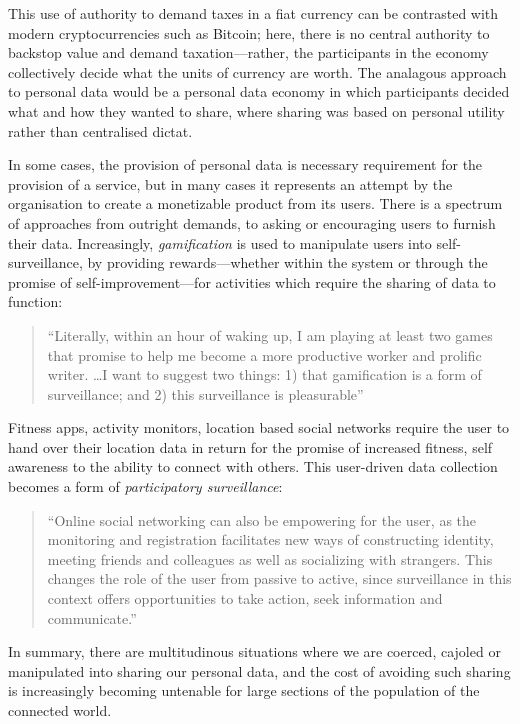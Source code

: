 \documentclass{IOS-Book-Article}     %
\begin{document}
This use of authority to demand taxes in a fiat currency can be contrasted with modern
cryptocurrencies such as Bitcoin; here, there is no central authority to 
backstop value and demand taxation---rather, the participants in the economy collectively decide what the units
of currency are worth. 
The analagous approach to personal data would be a personal data economy in
which participants decided what and how they wanted to share, where sharing was
based on personal utility rather than centralised dictat.

In some cases, the provision of personal data is
necessary requirement for the provision of a service, but in many
cases it represents an attempt by the organisation to create a monetizable product from
its users. There is a spectrum of approaches from outright demands, 
to asking or encouraging users to furnish their data.
Increasingly, \emph{gamification} is used to manipulate
users into self-surveillance, by providing rewards---whether within the system
or through the promise of self-improvement---for activities which require the
sharing of data to function:
\begin{quote}``Literally, within an hour of waking up, I am playing at least two games that promise to help me become a more productive
worker and prolific writer. \ldots I want to suggest two things: 1) that gamification is a form of
surveillance; and 2) this surveillance is
pleasurable''~\cite{whitson2013gaming}\end{quote}
Fitness apps, activity monitors, location based social networks require the
user to hand over their location data in return for the promise of increased
fitness, self awareness to the ability to connect with others. 
This user-driven data collection becomes a form of \emph{participatory surveillance}:
\begin{quote}
``Online social networking can also be empowering for the user, as the monitoring and 
registration facilitates new ways of constructing identity, meeting friends and colleagues 
as well as socializing with strangers. This changes the role of the user from passive to 
active, since surveillance in this context offers opportunities to take action, seek 
information and communicate.''~\cite{albrechtslund2008online}
\end{quote} 

In summary, there are multitudinous situations where we are coerced, cajoled or
manipulated into sharing our personal data, and the cost of avoiding such
sharing is increasingly becoming untenable for large sections of the population
of the connected world.
\end{document}
